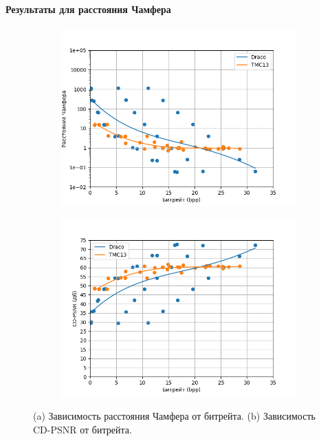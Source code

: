 \documentclass[a4paper,12pt]{extreport}
\begin{document}
\paragraph{Результаты для расстояния Чамфера}

\begin{figure}[H]
    \centering
    \begin{subfigure}{0.49\textwidth}
        \includegraphics[width=\linewidth]{assets/approx_cd_p2pt.png}
        \caption{}
    \end{subfigure}
    \begin{subfigure}{0.49\textwidth}
        \includegraphics[width=\linewidth]{assets/approx_cdpsnr_p2pt.png}
        \caption{}
    \end{subfigure}
    \caption{ (a) Зависимость расстояния Чамфера от битрейта. (b) Зависимость
    CD-PSNR от битрейта. }
    \label{img:pcc_arena_cd_bpp}
\end{figure}
\end{document}
